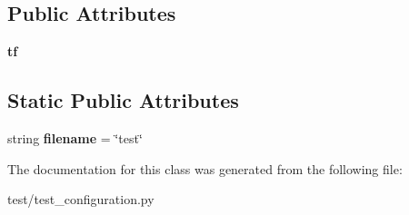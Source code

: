 \subsection*{Public Attributes}
\begin{DoxyCompactItemize}
\item 
\hypertarget{classtest__configuration_1_1_configuration_test_a17b43808c59024e2240c485331e2ec1f}{{\bfseries tf}}\label{classtest__configuration_1_1_configuration_test_a17b43808c59024e2240c485331e2ec1f}

\end{DoxyCompactItemize}
\subsection*{Static Public Attributes}
\begin{DoxyCompactItemize}
\item 
\hypertarget{classtest__configuration_1_1_configuration_test_a73ef01cf9f31d245934eadf2c4279d89}{string {\bfseries filename} = \char`\"{}test\char`\"{}}\label{classtest__configuration_1_1_configuration_test_a73ef01cf9f31d245934eadf2c4279d89}

\end{DoxyCompactItemize}


The documentation for this class was generated from the following file\-:\begin{DoxyCompactItemize}
\item 
test/test\-\_\-configuration.\-py\end{DoxyCompactItemize}

